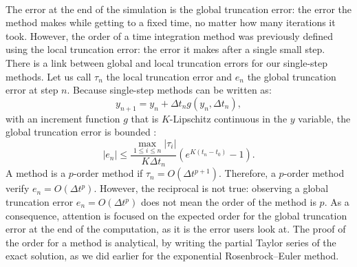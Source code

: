       \paragraph{}
      The error at the end of the simulation is the global truncation error: the error the method makes while getting to a fixed time, no matter how many iterations it took.
      However, the order of a time integration method was previously defined using the local truncation error: the error it makes after a single small step.
      There is a link between global and local truncation errors for our single-step methods.
      Let us call $\tau_n$ the local truncation error and $e_n$ the global truncation error at step $n$.
      Because single-step methods can be written as:
      \begin{equation}
        y_{n+1} = y_n + \Delta t_n g\left(y_n, \Delta t_n\right) ,
      \end{equation}
      with an increment function $g$ that is $K$-Lipschitz continuous in the $y$ variable, the global truncation error is bounded \cite{SueliMayers2003}:
      \begin{equation}
        \left| e_n \right| \leq \frac{\max_{1 \leq i \leq n} \left| \tau_i \right|}{K \Delta t_n} \left(e^{K\left(t_n - t_0\right)} - 1\right) .
      \end{equation}
      A method is a $p$-order method if $\tau_n = O\left(\Delta t^{p+1}\right)$.
      Therefore, a $p$-order method verify $e_n = O\left(\Delta t^{p}\right)$.
      However, the reciprocal is not true: observing a global truncation error $e_n = O\left(\Delta t^{p}\right)$ does not mean the order of the method is $p$.
      As a consequence, attention is focused on the expected order for the global truncation error at the end of the computation, as it is the error users look at.
      The proof of the order for a method is analytical, by writing the partial Taylor series of the exact solution, as we did earlier for the exponential Rosenbrock--Euler method.

